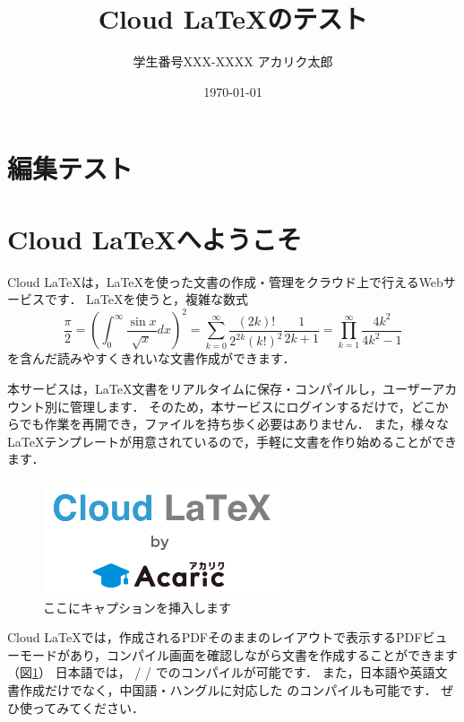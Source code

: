\documentclass[platex,dvipdfmx]{jlreq}			%
\title{Cloud LaTeXのテスト}
\author{学生番号XXX-XXXX アカリク太郎}
\date{\today}
\begin{document}
\maketitle
\section{編集テスト}
\section{Cloud LaTeXへようこそ}
Cloud LaTeXは，\LaTeX を使った文書の作成・管理をクラウド上で行えるWebサービスです．
\LaTeX を使うと，複雑な数式
\begin{equation}
\frac{\pi}{2} =
\left( \int_{0}^{\infty} \frac{\sin x}{\sqrt{x}} dx \right)^2 =
\sum_{k=0}^{\infty} \frac{(2k)!}{2^{2k}(k!)^2} \frac{1}{2k+1} =
\prod_{k=1}^{\infty} \frac{4k^2}{4k^2 - 1}
\end{equation}
を含んだ読みやすくきれいな文書作成ができます．

本サービスは，\LaTeX 文書をリアルタイムに保存・コンパイルし，ユーザーアカウント別に管理します．
そのため，本サービスにログインするだけで，どこからでも作業を再開でき，ファイルを持ち歩く必要はありません．
また，様々な \LaTeX テンプレートが用意されているので，手軽に文書を作り始めることができます．
\begin{figure}
\centering
\includegraphics[width=70mm]{figures/Sample.png}
\caption{ここにキャプションを挿入します}
\label{fig:model}
\end{figure}

Cloud LaTeXでは，作成されるPDFそのままのレイアウトで表示するPDFビューモードがあり，コンパイル画面を確認しながら文書を作成することができます（図\ref{fig:model}）
日本語では， \pLaTeX / \upLaTeX / \LuaLaTeX でのコンパイルが可能です．
また，日本語や英語文書作成だけでなく，中国語・ハングルに対応した \XeLaTeX のコンパイルも可能です．
ぜひ使ってみてください．
\end{document}
